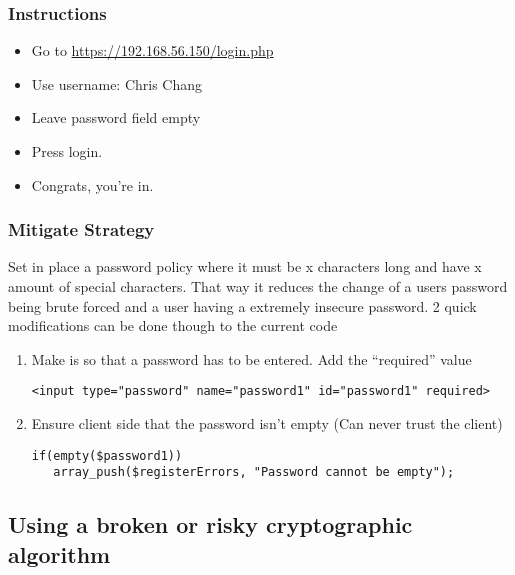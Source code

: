 \documentclass[titlepage]{article}
\begin{document}

      \subsubsection{Instructions} %
      \label{ssub:empty_password_instructions}
      
      \begin{itemize}
         \item Go to \url{https://192.168.56.150/login.php}
         \item Use username: Chris Chang
         \item Leave password field empty
         \item Press login.
         \item Congrats, you're in. 
      \end{itemize}


      \subsubsection{Mitigate Strategy} %
      \label{ssub:empty_password_mitigate_strategy}
      
      Set in place a password policy where it must be x characters long and have x amount of special characters. That way it reduces the change of a users password being brute forced and a user having a extremely insecure password. 2 quick modifications can be done though to the current code

      \begin{enumerate}
         \item Make is so that a password has to be entered. Add the ``required'' value
      \begin{lstlisting}
<input type="password" name="password1" id="password1" required>
      \end{lstlisting}
         \item Ensure client side that the password isn't empty (Can never trust the client)
         \begin{lstlisting}
if(empty($password1)) 
   array_push($registerErrors, "Password cannot be empty"); 
         \end{lstlisting}
      \end{enumerate}


   \subsection{Using a broken or risky cryptographic algorithm} %
   \label{sub:using_a_broken_or_risky_cryptographic_algorithm}
   
\end{document}
